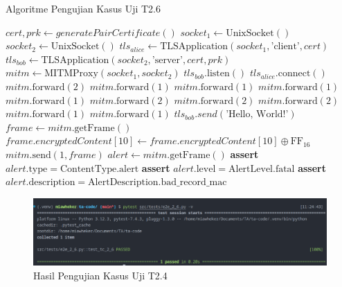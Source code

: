 \begin{algorithm}
  \caption{Algoritme Pengujian Kasus Uji T2.6}
  \label{alg:unit.test.t2.6}
  \begin{algorithmic}
    \State $cert, prk \gets generatePairCertificate()$
    \State $socket_1 \gets \text{UnixSocket}()$
    \State $socket_2 \gets \text{UnixSocket}()$
    \State $tls_{alice} \gets \text{TLSApplication}(socket_1, \text{'client'}, cert)$ 
    \State $tls_{bob} \gets \text{TLSApplication}(socket_2, \text{'server'}, cert, prk)$
    \State $mitm \gets \text{MITMProxy}(socket_1, socket_2)$
    \State
    \State $tls_{bob}.\text{listen}()$  
    \State $tls_{alice}.\text{connect}()$  
    \State
    \State $mitm.\text{forward}(2)$ 
    \State $mitm.\text{forward}(1)$ 
    \State $mitm.\text{forward}(1)$ 
    \State $mitm.\text{forward}(1)$ 
    \State $mitm.\text{forward}(1)$ 
    \State $mitm.\text{forward}(2)$ 
    \State $mitm.\text{forward}(2)$ 
    \State $mitm.\text{forward}(2)$ 
    \State $mitm.\text{forward}(1)$ 
    \State $mitm.\text{forward}(1)$ 
    \State
    \State $tls_{bob}.send(\text{'Hello, World!'})$
    \State $frame \gets mitm.\text{getFrame}()$
    \State $frame.encryptedContent[10] \gets frame.encryptedContent[10] \oplus \text{FF}_{16}$ 
    \State $mitm.\text{send}(1, frame)$
    \State
    \State $alert \gets mitm.\text{getFrame}()$
    \State \textbf{assert} $alert.\text{type} = \text{ContentType.alert}$
    \State \textbf{assert} $alert.\text{level} = \text{AlertLevel.fatal}$
    \State \textbf{assert} $alert.\text{description} = \text{AlertDescription.bad\_record\_mac}$
  \end{algorithmic}
\end{algorithm}

\begin{figure}[ht]
  \centering
  \includegraphics[width=\textwidth]{chapters/res/appendix-4/2.6.png}
  \caption{Hasil Pengujian Kasus Uji T2.4}
  \label{fig:unit.test.t2.6}
\end{figure}

